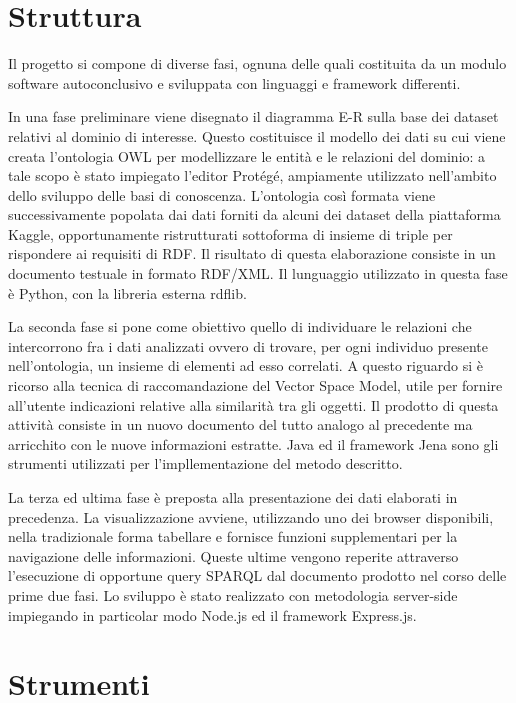 \documentclass[Lau,binding=0.6cm,noexaminfo,oneside]{sapthesis}
\begin{document}
\section{Struttura}

Il progetto si compone di diverse fasi, ognuna delle quali costituita da un modulo software autoconclusivo e sviluppata con linguaggi e framework differenti.\medskip

In una fase preliminare viene disegnato il diagramma E-R sulla base dei dataset relativi al dominio di interesse. Questo costituisce il modello dei dati su cui viene creata l'ontologia OWL per modellizzare le entità e le relazioni del dominio: a tale scopo è stato impiegato l'editor Protégé, ampiamente utilizzato nell'ambito dello sviluppo delle basi di conoscenza.
L'ontologia così formata viene successivamente popolata dai dati forniti da alcuni dei dataset della piattaforma Kaggle, opportunamente ristrutturati sottoforma di insieme di triple per rispondere ai requisiti di RDF. Il risultato di questa elaborazione consiste in un documento testuale in formato RDF/XML. Il lunguaggio utilizzato in questa fase è Python, con la libreria esterna rdflib.\medskip

La seconda fase si pone come obiettivo quello di individuare le relazioni che intercorrono fra i dati analizzati ovvero di trovare, per ogni individuo presente nell'ontologia, un insieme di elementi ad esso correlati. A questo riguardo si è ricorso alla tecnica di raccomandazione del Vector Space Model, utile per fornire all'utente indicazioni relative alla similarità tra gli oggetti. Il prodotto di questa attività consiste in un nuovo documento del tutto analogo al precedente ma arricchito con le nuove informazioni estratte. Java ed il framework Jena sono gli strumenti utilizzati per l'impllementazione del metodo descritto.\medskip

La terza ed ultima fase è preposta alla presentazione dei dati elaborati in precedenza. La visualizzazione avviene, utilizzando uno dei browser disponibili, nella tradizionale forma tabellare e fornisce funzioni supplementari per la navigazione delle informazioni. Queste ultime vengono reperite attraverso l'esecuzione di opportune query SPARQL dal documento prodotto nel corso delle prime due fasi. Lo sviluppo è stato realizzato con metodologia server-side impiegando in particolar modo Node.js ed il framework Express.js.

\section{Strumenti}
\end{document}
